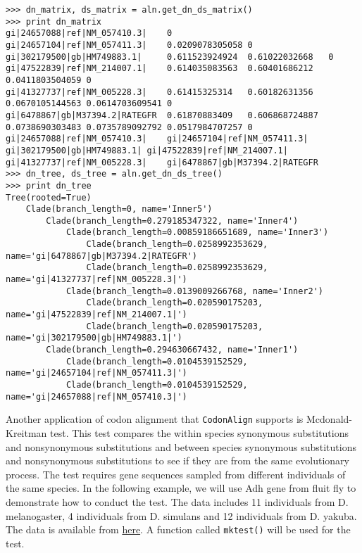\begin{verbatim}
>>> dn_matrix, ds_matrix = aln.get_dn_ds_matrix()
>>> print dn_matrix
gi|24657088|ref|NM_057410.3|    0
gi|24657104|ref|NM_057411.3|    0.0209078305058 0
gi|302179500|gb|HM749883.1|     0.611523924924  0.61022032668   0
gi|47522839|ref|NM_214007.1|    0.614035083563  0.60401686212   0.0411803504059 0
gi|41327737|ref|NM_005228.3|    0.61415325314   0.60182631356   0.0670105144563 0.0614703609541 0
gi|6478867|gb|M37394.2|RATEGFR  0.61870883409   0.606868724887  0.0738690303483 0.0735789092792 0.0517984707257 0
gi|24657088|ref|NM_057410.3|    gi|24657104|ref|NM_057411.3|    gi|302179500|gb|HM749883.1| gi|47522839|ref|NM_214007.1|    gi|41327737|ref|NM_005228.3|    gi|6478867|gb|M37394.2|RATEGFR
>>> dn_tree, ds_tree = aln.get_dn_ds_tree()
>>> print dn_tree
Tree(rooted=True)
    Clade(branch_length=0, name='Inner5')
        Clade(branch_length=0.279185347322, name='Inner4')
            Clade(branch_length=0.00859186651689, name='Inner3')
                Clade(branch_length=0.0258992353629, name='gi|6478867|gb|M37394.2|RATEGFR')
                Clade(branch_length=0.0258992353629, name='gi|41327737|ref|NM_005228.3|')
            Clade(branch_length=0.0139009266768, name='Inner2')
                Clade(branch_length=0.020590175203, name='gi|47522839|ref|NM_214007.1|')
                Clade(branch_length=0.020590175203, name='gi|302179500|gb|HM749883.1|')
        Clade(branch_length=0.294630667432, name='Inner1')
            Clade(branch_length=0.0104539152529, name='gi|24657104|ref|NM_057411.3|')
            Clade(branch_length=0.0104539152529, name='gi|24657088|ref|NM_057410.3|')
\end{verbatim}

Another application of codon alignment that \verb|CodonAlign| supports
is Mcdonald-Kreitman test. This test compares the within species
synonymous substitutions and nonsynonymous substitutions and between
species synonymous substitutions and nonsynonymous substitutions to see
if they are from the same evolutionary process. The test requires gene
sequences sampled from different individuals of the same species. In the
following example, we will use Adh gene from fluit fly to demonstrate
how to conduct the test. The data includes 11 individuals from
D. melanogaster, 4 individuals from D. simulans and 12 individuals from
D. yakuba. The data is available from
\href{http://zruanweb.com/adh.zip}{here}. A function called
\verb|mktest()| will be used for the test.

